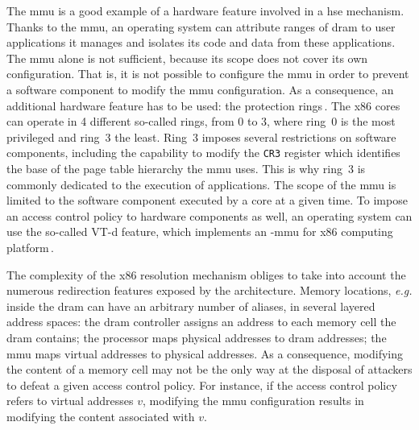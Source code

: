The \ac{mmu} is a good example of a hardware feature involved in a \ac{hse}
mechanism.
%
Thanks to the \ac{mmu}, an operating system can attribute ranges of \ac{dram} to
user applications it manages and isolates its code and data from these
applications.
%
The \ac{mmu} alone is not sufficient, because its scope does not cover its own
configuration.
%
That is, it is not possible to configure the \ac{mmu} in order to prevent a
software component to modify the \ac{mmu} configuration.
%
As a consequence, an additional hardware feature has to be used: the protection
rings\,\cite[Volume 3, Section 5.5]{intel2014manual}.
%
The x86 cores can operate in 4 different so-called rings, from 0 to 3, where
ring~0 is the most privileged and ring~3 the least.
%
Ring~3 imposes several restrictions on software components, including the
capability to modify the \texttt{CR3} register which identifies the base of the
page table hierarchy the \ac{mmu} uses.
%
This is why ring~3 is commonly dedicated to the execution of applications.
%
The scope of the \ac{mmu} is limited to the software component executed by a
core at a given time.
%
To impose an access control policy to hardware components as well, an operating
system can use the so-called VT-d feature, which implements an \IO-\ac{mmu} for
x86 computing platform\,\cite{abramson2006vtd}.

%
%

The complexity of the x86 \IO resolution mechanism obliges to take into account
the numerous redirection features exposed by the architecture.
%
Memory locations, \emph{e.g.} inside the \ac{dram} can have an arbitrary number
of aliases, in several layered address spaces: the \ac{dram} controller assigns
an address to each memory cell the \ac{dram} contains; the processor maps
physical addresses to \ac{dram} addresses; the \ac{mmu} maps virtual addresses
to physical addresses.
%
As a consequence, modifying the content of a memory cell may not be the only way
at the disposal of attackers to defeat a given access control policy.
%
For instance, if the access control policy refers to virtual addresses \( v \),
modifying the \ac{mmu} configuration results in modifying the content associated
with \( v \).

